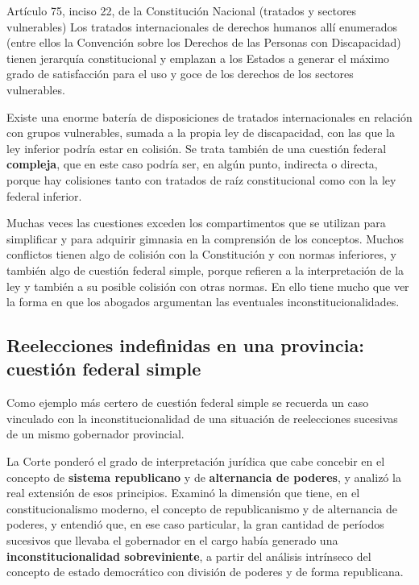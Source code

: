 \documentclass[12pt,oneside]{book}
\begin{document}
\begin{norma}{Artículo 75, inciso 22, de la Constitución Nacional (tratados y sectores vulnerables)}
Los tratados internacionales de derechos humanos allí enumerados (entre ellos la Convención sobre los Derechos de las Personas con Discapacidad) tienen jerarquía constitucional y emplazan a los Estados a generar el máximo grado de satisfacción para el uso y goce de los derechos de los sectores vulnerables.
\end{norma}

Existe una enorme batería de disposiciones de tratados internacionales en relación con grupos vulnerables, sumada a la propia ley de discapacidad, con las que la ley inferior podría estar en colisión. Se trata también de una cuestión federal \textbf{compleja}, que en este caso podría ser, en algún punto, indirecta o directa, porque hay colisiones tanto con tratados de raíz constitucional como con la ley federal inferior.

Muchas veces las cuestiones exceden los compartimentos que se utilizan para simplificar y para adquirir gimnasia en la comprensión de los conceptos. Muchos conflictos tienen algo de colisión con la Constitución y con normas inferiores, y también algo de cuestión federal simple, porque refieren a la interpretación de la ley y también a su posible colisión con otras normas. En ello tiene mucho que ver la forma en que los abogados argumentan las eventuales inconstitucionalidades.

\subsection{Reelecciones indefinidas en una provincia: cuestión federal simple}

Como ejemplo más certero de cuestión federal simple se recuerda un caso vinculado con la inconstitucionalidad de una situación de reelecciones sucesivas de un mismo gobernador provincial.

La Corte ponderó el grado de interpretación jurídica que cabe concebir en el concepto de \textbf{sistema republicano} y de \textbf{alternancia de poderes}, y analizó la real extensión de esos principios. Examinó la dimensión que tiene, en el constitucionalismo moderno, el concepto de republicanismo y de alternancia de poderes, y entendió que, en ese caso particular, la gran cantidad de períodos sucesivos que llevaba el gobernador en el cargo había generado una \textbf{inconstitucionalidad sobreviniente}, a partir del análisis intrínseco del concepto de estado democrático con división de poderes y de forma republicana.
\end{document}
